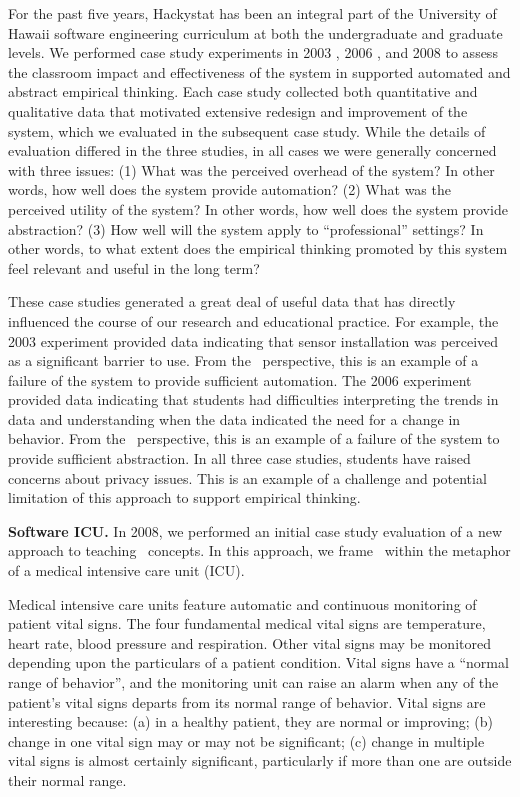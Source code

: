 For the past five years, Hackystat has been an integral part of the
University of Hawaii software engineering curriculum at both the
undergraduate and graduate levels.  We performed case study experiments in
2003 \citep{csdl2-03-12,csdl2-03-13}, 2006 \citep{csdl2-07-02}, and 2008
\citep{csdl2-09-02,csdl2-09-03} to assess the classroom impact and
effectiveness of the system in supported automated and abstract empirical
thinking.  Each case study collected both quantitative and qualitative data
that motivated extensive redesign and improvement of the system, which we
evaluated in the subsequent case study. While the details of evaluation
differed in the three studies, in all cases we were generally concerned
with three issues: (1) What was the perceived overhead of the system? In
other words, how well does the system provide automation?  (2) What was the
perceived utility of the system? In other words, how well does the system
provide abstraction?  (3) How well will the system apply to
``professional'' settings?  In other words, to what extent does the
empirical thinking promoted by this system feel relevant and useful in the
long term?

These case studies generated a great deal of useful data that has directly
influenced the course of our research and educational practice. For
example, the 2003 experiment provided data indicating that sensor
installation was perceived as a significant barrier to use. From the \eCT\
perspective, this is an example of a failure of the system to provide
sufficient automation.  The 2006 experiment provided data indicating that
students had difficulties interpreting the trends in data and understanding
when the data indicated the need for a change in behavior.  From the \eCT\
perspective, this is an example of a failure of the system to provide
sufficient abstraction.  In all three case studies, students have raised
concerns about privacy issues.  This is an example of a challenge and
potential limitation of this approach to support empirical thinking.

{\bf Software ICU.}  In 2008, we performed an initial case study evaluation 
of a new approach to teaching \eCT\ concepts.  In this approach, we frame 
\eCT\ within the metaphor of a medical intensive care unit (ICU). 

Medical intensive care units feature automatic and continuous monitoring of
patient vital signs.  The four fundamental medical vital signs are
temperature, heart rate, blood pressure and respiration.  Other vital signs
may be monitored depending upon the particulars of a patient condition.
Vital signs have a ``normal range of behavior'', and the monitoring unit
can raise an alarm when any of the patient's vital signs departs from its
normal range of behavior.  Vital signs are interesting because: (a) in a
healthy patient, they are normal or improving; (b) change in one vital sign
may or may not be significant; (c) change in multiple vital signs is almost
certainly significant, particularly if more than one are outside their
normal range.

